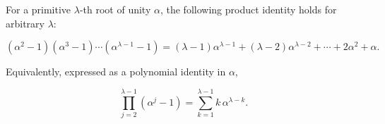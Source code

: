 For a primitive $\lambda$-th root of unity $\alpha$, the following product identity holds for arbitrary $\lambda$:

$$
(\alpha^2 - 1)(\alpha^3 - 1) \cdots (\alpha^{\lambda-1} - 1) = (\lambda - 1)\alpha^{\lambda-1} + (\lambda - 2)\alpha^{\lambda-2} + \cdots + 2\alpha^2 + \alpha.
$$

Equivalently, expressed as a polynomial identity in $\alpha$,

$$
\prod_{j=2}^{\lambda-1} (\alpha^j - 1) = \sum_{k=1}^{\lambda-1} k \,\alpha^{\lambda-k}.
$$
